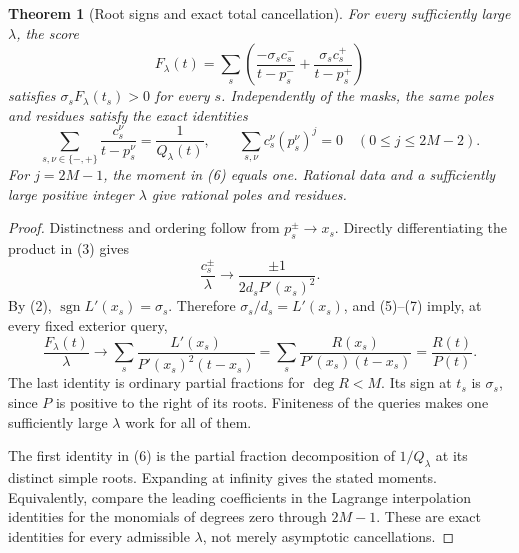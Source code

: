 \documentclass[11pt]{article}
\newtheorem{theorem}{Theorem}
\begin{document}
\begin{theorem}[Root signs and exact total cancellation]
For every sufficiently large $\lambda$, the score
\[
 F_\lambda(t)=\sum_s\left(
       \frac{-\sigma_s c_s^-}{t-p_s^-}
       +\frac{\sigma_s c_s^+}{t-p_s^+}\right)                 \tag{5}
\]
satisfies $\sigma_sF_\lambda(t_s)>0$ for every $s$. Independently
of the masks, the same poles and residues satisfy the exact identities
\[
 \sum_{s,\nu\in\{-,+\}}\frac{c_s^\nu}{t-p_s^\nu}
       =\frac1{Q_\lambda(t)},\qquad
 \sum_{s,\nu}c_s^\nu(p_s^\nu)^j=0\quad(0\leq j\leq2M-2).
                                                               \tag{6}
\]
For $j=2M-1$, the moment in (6) equals one. Rational data and a
sufficiently large positive integer $\lambda$ give rational poles
and residues.
\end{theorem}
\begin{proof}
Distinctness and ordering follow from $p_s^\pm\longrightarrow x_s$.
Directly differentiating the product in (3) gives
\[
 \frac{c_s^\pm}{\lambda}
       \longrightarrow \frac{\pm1}{2d_s P'(x_s)^2}.
                                                               \tag{7}
\]
By (2), $\operatorname{sgn}L'(x_s)=\sigma_s$. Therefore
$\sigma_s/d_s=L'(x_s)$, and (5)--(7) imply, at every fixed
exterior query,
\[
 \frac{F_\lambda(t)}{\lambda}
 \longrightarrow
 \sum_s\frac{L'(x_s)}{P'(x_s)^2(t-x_s)}
 =\sum_s\frac{R(x_s)}{P'(x_s)(t-x_s)}
 =\frac{R(t)}{P(t)}.                                        \tag{8}
\]
The last identity is ordinary partial fractions for $\deg R<M$.
Its sign at $t_s$ is $\sigma_s$, since $P$ is positive to the
right of its roots. Finiteness of the queries makes one sufficiently
large $\lambda$ work for all of them.

The first identity in (6) is the partial fraction decomposition of
$1/Q_\lambda$ at its distinct simple roots. Expanding at infinity
gives the stated moments. Equivalently, compare the leading
coefficients in the Lagrange interpolation identities for the
monomials of degrees zero through $2M-1$. These are exact identities
for every admissible $\lambda$, not merely asymptotic cancellations.
\end{proof}
\end{document}
